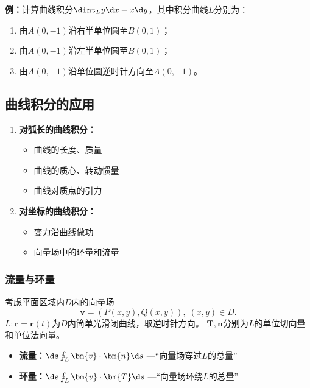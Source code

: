{\bf 例：}计算曲线积分$\dint_Ly\d x-x\d y$，其中积分曲线$L$分别为：
\begin{enumerate}[(1)]
  \setlength{\itemindent}{1cm}
  \item 由$A(0,-1)$沿右半单位圆至$B(0,1)$；
  \item 由$A(0,-1)$沿左半单位圆至$B(0,1)$；
  \item 由$A(0,-1)$沿单位圆逆时针方向至$A(0,-1)$。
\end{enumerate}

\subsection{曲线积分的应用}

\begin{enumerate}
  \item {\bf 对弧长的曲线积分：}
  \begin{itemize}
    \item 曲线的长度、质量
    \item 曲线的质心、转动惯量
    \item 曲线对质点的引力
  \end{itemize}
  \item {\bf 对坐标的曲线积分：}
  \begin{itemize}
    \item 变力沿曲线做功
    \item {向量场中的环量和流量}
  \end{itemize}
\end{enumerate}

\subsubsection{流量与环量}

考虑平面区域内$D$内的向量场
$$\bm{v}=(P(x,y),Q(x,y)),\;(x,y)\in D.$$
$L:\bm{r}=\bm{r}(t)$为$D$内简单光滑闭曲线，取逆时针方向。
$\bm{T},\bm{n}$分别为$L$的单位切向量和单位法向量。
\begin{itemize}
  \item {\bf 流量：}$\ds\oint_L\bm{v}\cdot\bm{n}\d s$
  {\;—“向量场穿过$L$的总量”}
  \item {\bf 环量：}$\ds\oint_L\bm{v}\cdot\bm{T}\d s$
  {\;—“向量场环绕$L$的总量”}
\end{itemize}

